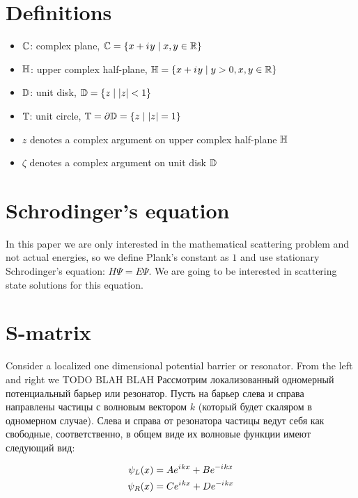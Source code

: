 \section{Definitions}
\begin{itemize}
\item $\mathbb{C}$: complex plane, $\mathbb{C} = \{ x + {i\mkern1mu} y \mid x, y \in \mathbb{R} \}$ 
\item $\mathbb{H}$: upper complex half-plane, $\mathbb{H} = \{ x + {i\mkern1mu} y \mid y > 0, x, y \in \mathbb{R} \}$
\item $\mathbb{D}$: unit disk, $\mathbb{D} = \{ z \mid \abs{z} < 1 \}$
\item $\mathbb{T}$: unit circle, $\mathbb{T} = \partial \mathbb{D} =  \{z \mid \abs{z} = 1 \}$
\item $z$ denotes a complex argument on upper complex half-plane $\mathbb{H}$
\item $\zeta$ denotes a complex argument on unit disk $\mathbb{D}$
\end{itemize}

\section{Schrodinger's equation}
In this paper we are only interested in the mathematical scattering problem and not actual energies, so we define Plank's constant as $1$ and use stationary Schrodinger's equation: $H \Psi = E \Psi$. We are going to be interested in scattering state solutions for this equation.

\section{S-matrix}\label{sec:smatrix}
Consider a localized one dimensional potential barrier or resonator. From the left and right we TODO BLAH BLAH
Рассмотрим локализованный одномерный потенциальный барьер или резонатор. Пусть на барьер слева и справа направлены частицы с волновым вектором $k$ (который будет скаляром в одномерном случае). Слева и справа от резонатора частицы ведут себя как свободные, соответственно, в общем виде их волновые функции имеют следующий вид:

\begin{equation}\label{eq:wlwl}
\begin{aligned}
   \psi_L(x) &= A \eexp{\iu k x} + B \eexp{-\iu k x}
\\ \psi_R(x) &= C \eexp{\iu k x} + D \eexp{-\iu k x}
\end{aligned}
\end{equation}

